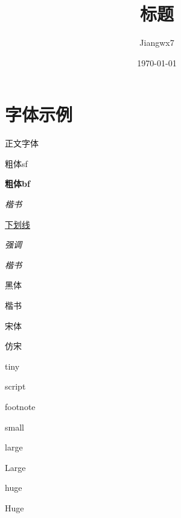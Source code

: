 \documentclass[11pt]{ctexart} %
\title{标题}
\author{Jiangwx7}
\date{\today}
\begin{document}
\maketitle
\tableofcontents
\thispagestyle{empty}

\section{字体示例}
正文字体

\textsf{粗体sf}

\textbf{粗体bf}

\textit{楷书}

\underline{下划线}

\emph{强调}

\textsl{楷书}

{\heiti 黑体}

{\kaishu 楷书}

{\songti 宋体}

{\fangsong 仿宋}

\newpage

{\tiny tiny}

{\scriptsize script}

{\footnotesize footnote}

{\small small}

\thispagestyle{fancy}

{\large large}

{\Large Large}

{\huge huge}

{\Huge Huge}
\end{document}
